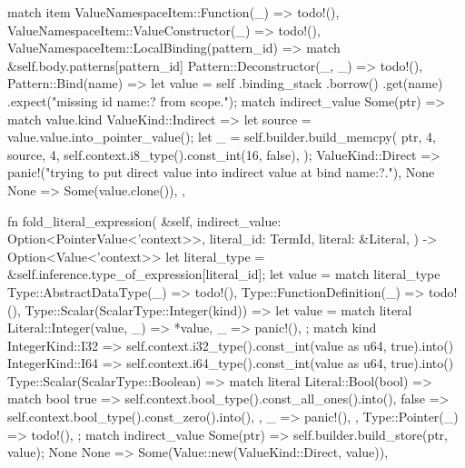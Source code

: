 \documentclass[
  oneside,
  english,
  coorientadorbanca,
  noabntexcite
]{ufsc-thesis-rn46-2019}
\begin{document}
\begin{rustcode}
{{        match item {
            ValueNamespaceItem::Function(_) => todo!(),
            ValueNamespaceItem::ValueConstructor(_) => todo!(),
            ValueNamespaceItem::LocalBinding(pattern_id) => match &self.body.patterns[pattern_id] {
                Pattern::Deconstructor(_, _) => todo!(),
                Pattern::Bind(name) => {
                    let value = self
                        .binding_stack
                        .borrow()
                        .get(name)
                        .expect("missing id {name:?} from scope.");
                    match indirect_value {
                        Some(ptr) => {
                            match value.kind {
                                    ValueKind::Indirect => {
                                        let source = value.value.into_pointer_value();
                                        let _ = self.builder.build_memcpy(
                                            ptr,
                                            4,
                                            source,
                                            4,
                                            self.context.i8_type().const_int(16, false),
                                        );
                                    }
                                    ValueKind::Direct => panic!("trying to put direct value into indirect value at bind {name:?}."),
                                }
                            None
                        }
                        None => Some(value.clone()),
                    }
                }
            },
        }
    }

    fn fold_literal_expression(
        &self,
        indirect_value: Option<PointerValue<'context>>,
        literal_id: TermId,
        literal: &Literal,
    ) -> Option<Value<'context>> {
        let literal_type = &self.inference.type_of_expression[literal_id];
        let value = match literal_type {
            Type::AbstractDataType(_) => todo!(),
            Type::FunctionDefinition(_) => todo!(),
            Type::Scalar(ScalarType::Integer(kind)) => {
                let value = match literal {
                    Literal::Integer(value, _) => *value,
                    _ => panic!(),
                };
                match kind {
                    IntegerKind::I32 => {
                        self.context.i32_type().const_int(value as u64, true).into()
                    }
                    IntegerKind::I64 => {
                        self.context.i64_type().const_int(value as u64, true).into()
                    }
                }
            }
            Type::Scalar(ScalarType::Boolean) => match literal {
                Literal::Bool(bool) => match bool {
                    true => self.context.bool_type().const_all_ones().into(),
                    false => self.context.bool_type().const_zero().into(),
                },
                _ => panic!(),
            },
            Type::Pointer(_) => todo!(),
        };
        match indirect_value {
            Some(ptr) => {
                self.builder.build_store(ptr, value);
                None
            }
            None => Some(Value::new(ValueKind::Direct, value)),
        }
    }

}
\end{rustcode}
\end{document}

